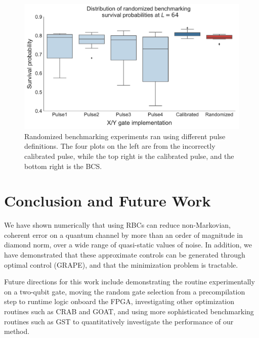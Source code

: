 \documentclass[aps,nofootinbib,pra,notitlepage,twocolumn]{revtex4-1}
\begin{document}
\begin{figure}
  \centering
  \includegraphics[width=\columnwidth]{rb_data.pdf}
  \caption{Randomized benchmarking experiments ran using different pulse definitions. The four plots on the left are from the incorrectly calibrated pulse, while the top right is the calibrated pulse, and the bottom right is the BCS.}
  \label{fig:rb}
\end{figure}

\section{Conclusion and Future Work}
We have shown numerically that using RBCs can reduce non-Markovian, coherent error on a quantum channel by more than an order of magnitude in diamond norm, over a wide range of quasi-static values of noise. In addition, we have demonstrated that these approximate controls can be generated through optimal control (GRAPE), and that the minimization problem is tractable.


Future directions for this work include demonstrating the routine experimentally on a two-qubit gate, moving the random gate selection from a precompilation step to runtime logic onboard the FPGA, investigating other optimization routines such as CRAB \cite{Caneva2011} and GOAT\cite{Machnes2018}, and using more sophisticated benchmarking routines such as GST\cite{BlumeKohout2017} to quantitatively investigate the performance of our method.
\end{document}
